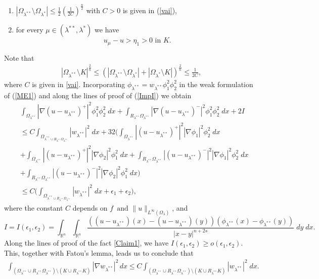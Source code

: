 \documentclass[11pt, notitlepage]{article}
\def\R{\mathbb{R}}
\begin{document}
{\begin{enumerate}
    \item[(i)] $|\Omega_{\lambda^{**}}\setminus\Omega_{\lambda^*}|\leq \frac{1}{2}(\frac{1}{2C})^\frac{n}{2}$ with $C>0$ is given in (\ref{vai}),
    \item[(ii)] for every $\mu\in (\lambda^{**},\lambda^*)$ we have $$u_\mu-u>\eta_1>0\text{ in }K.$$
\end{enumerate}
 Note that 
\begin{align}\label{vai2}
    |\Omega_{\lambda^{**}}\setminus K|^\frac{2}{n}\leq (|\Omega_{\lambda^{**}}\setminus\Omega_{\lambda^*}| +|\Omega_{\lambda^*}\setminus K|)^\frac{2}{n}\leq \frac{1}{2C}, 
\end{align}
where $C$ is given in \eqref{vai}. Incorporating $\phi_{\lambda^{**}}=w_{\lambda^{**}}\phi_1^2\phi_2^2$ in the weak formulation of (\ref{ME1}) and along the lines of proof of (\ref{ImpI}) we obtain
\begin{align}
    &\int_{\Omega_{\lambda^{**}}}|\nabla(u-u_{\lambda^{**}})^+|^2\phi_1^2\phi_2^2\;dx+\int_{R_{\lambda^{**}}\Omega_{\lambda^{**}}}|\nabla(u-u_{\lambda^{**}})^-|^2\phi_1^2\phi_2^2\;dx+2I\nonumber\\
    &\leq C\int_{\Omega_{\lambda^{**}\cup R_{\lambda^{**}}\Omega_{\lambda^{**}}}} |w_{\lambda^{**}}|^2\;dx+32\big(\int_{\Omega_{\lambda^{**}}}|(u-u_{\lambda^{**}})^+|^2|\nabla\phi_1|^2\phi_2^2\;dx\nonumber\\
    &+\int_{\Omega_{\lambda^{**}}}|(u-u_{\lambda^{**}})^+|^2|\nabla\phi_2|^2\phi_1^2\;dx+\int_{R_{\lambda^{**}}\Omega_{\lambda^{**}}}|(u-u_{\lambda^{**}})^-|^2|\nabla\phi_1|^2\phi_2^2\;dx\nonumber\\
    &+\int_{R_{\lambda^{**}}\Omega_{\lambda^{**}}}|(u-u_{\lambda^{**}})^-|^2|\nabla\phi_2|^2\phi_1^2\;dx\big)\nonumber\\
    &\leq C\Big( \int_{\Omega_{\lambda^{**}\cup R_{\lambda^{**}}\Omega_{\lambda^{**}}}} |w_{\lambda^{**}}|^2\;dx+\epsilon_1+\epsilon_2\Big),
\end{align}
where the constant $C$ depends on $f\,\mbox{ and }\|u\|_{L^\infty(\Omega_\lambda)}$, and 
$$I=I(\epsilon_1,\epsilon_2)=\int_{\R^n}\int_{\R^n}\frac{((u-u_{\lambda^{**}})(x)-(u-u_{\lambda^{**}})(y))(\phi_{\lambda^{**}}(x)-\phi_{\lambda^{**}}(y))}{|x-y|^{n+2s}}\;dy\;dx.$$
Along the lines of proof of the fact \eqref{Claim1}, we have $I(\epsilon_1,\epsilon_2)\geq o(\epsilon_1,\epsilon_2)$. This, together with Fatou's lemma, leads us to conclude that 
\begin{align}\label{vai}
    \int_{(\Omega_{\lambda^{**}}\cup R_{\lambda^{**}}\Omega_{\lambda^{**}})\setminus (K\cup R_{\lambda^{**}} K)}|\nabla w_{\lambda^{**}}|^2\,dx\leq C\int_{(\Omega_{\lambda^{**}}\cup R_{\lambda^{**}}\Omega_{\lambda^{**}})\setminus (K\cup R_{\lambda^{**}} K)}|w_{\lambda^{**}}|^2\;dx.

\end{align}}
\end{document}
